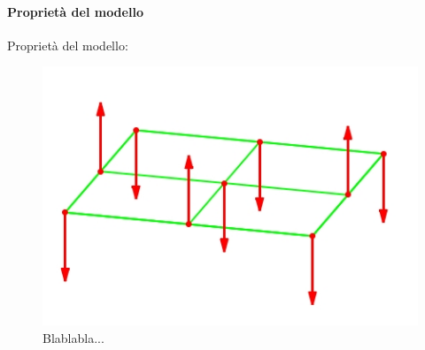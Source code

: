 \documentclass[11pt]{article}
\theoremstyle{plain}
\begin{document}
\paragraph{Proprietà del modello}
Proprietà del modello:
\begin{figure}

\centering

\includegraphics[scale=0.5]{Immagini/Isingmodel.jpg}

\caption{Blablabla...}\label{fig:1}

\end{figure}
\end{document}
